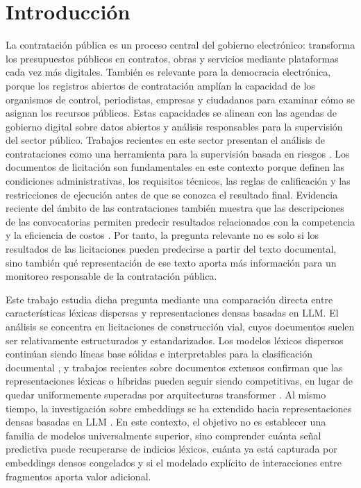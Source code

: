 \chapter{Introducción}
La contratación pública es un proceso central del gobierno electrónico: transforma los presupuestos públicos en contratos, obras y servicios mediante plataformas cada vez más digitales. También es relevante para la democracia electrónica, porque los registros abiertos de contratación amplían la capacidad de los organismos de control, periodistas, empresas y ciudadanos para examinar cómo se asignan los recursos públicos. Estas capacidades se alinean con las agendas de gobierno digital sobre datos abiertos y análisis responsables para la supervisión del sector público. Trabajos recientes en este sector presentan el análisis de contrataciones como una herramienta para la supervisión basada en riesgos \cite{salazar2024vigia}. Los documentos de licitación son fundamentales en este contexto porque definen las condiciones administrativas, los requisitos técnicos, las reglas de calificación y las restricciones de ejecución antes de que se conozca el resultado final. Evidencia reciente del ámbito de las contrataciones también muestra que las descripciones de las convocatorias permiten predecir resultados relacionados con la competencia y la eficiencia de costos \cite{acikalin2024procurementcalls}. Por tanto, la pregunta relevante no es solo si los resultados de las licitaciones pueden predecirse a partir del texto documental, sino también qué representación de ese texto aporta más información para un monitoreo responsable de la contratación pública.

Este trabajo estudia dicha pregunta mediante una comparación directa entre características léxicas dispersas y representaciones densas basadas en LLM. El análisis se concentra en licitaciones de construcción vial, cuyos documentos suelen ser relativamente estructurados y estandarizados. Los modelos léxicos dispersos continúan siendo líneas base sólidas e interpretables para la clasificación documental \cite{wang2012baselines}, y trabajos recientes sobre documentos extensos confirman que las representaciones léxicas o híbridas pueden seguir siendo competitivas, en lugar de quedar uniformemente superadas por arquitecturas transformer \cite{alvaprincipe2025survey}. Al mismo tiempo, la investigación sobre embeddings se ha extendido hacia representaciones densas basadas en LLM \cite{wang2024improvingembeddings}. En este contexto, el objetivo no es establecer una familia de modelos universalmente superior, sino comprender cuánta señal predictiva puede recuperarse de indicios léxicos, cuánta ya está capturada por embeddings densos congelados y si el modelado explícito de interacciones entre fragmentos aporta valor adicional.

